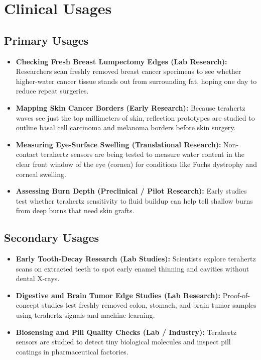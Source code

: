 \section{Clinical Usages}

\subsection{Primary Usages}
\begin{itemize}
  \item \textbf{Checking Fresh Breast Lumpectomy Edges (Lab Research):} Researchers scan freshly removed breast cancer specimens to see whether higher-water cancer tissue stands out from surrounding fat, hoping one day to reduce repeat surgeries.
  \item \textbf{Mapping Skin Cancer Borders (Early Research):} Because terahertz waves see just the top millimeters of skin, reflection prototypes are studied to outline basal cell carcinoma and melanoma borders before skin surgery.
  \item \textbf{Measuring Eye-Surface Swelling (Translational Research):} Non-contact terahertz sensors are being tested to measure water content in the clear front window of the eye (cornea) for conditions like Fuchs dystrophy and corneal swelling.
  \item \textbf{Assessing Burn Depth (Preclinical / Pilot Research):} Early studies test whether terahertz sensitivity to fluid buildup can help tell shallow burns from deep burns that need skin grafts.
\end{itemize}

\subsection{Secondary Usages}
\begin{itemize}
  \item \textbf{Early Tooth-Decay Research (Lab Studies):} Scientists explore terahertz scans on extracted teeth to spot early enamel thinning and cavities without dental X-rays.
  \item \textbf{Digestive and Brain Tumor Edge Studies (Lab Research):} Proof-of-concept studies test freshly removed colon, stomach, and brain tumor samples using terahertz signals and machine learning.
  \item \textbf{Biosensing and Pill Quality Checks (Lab / Industry):} Terahertz sensors are studied to detect tiny biological molecules and inspect pill coatings in pharmaceutical factories.
\end{itemize}

